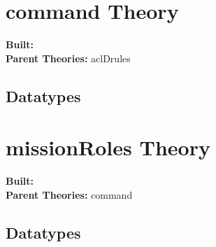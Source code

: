 

% 

% 
% 
% 
% 
% 
% 


\section{command Theory}
\begin{flushleft}
\textbf{Built:} \HOLcommandDate \\[2pt]
\textbf{Parent Theories:} aclDrules
\end{flushleft}

\subsection{Datatypes}

\HOLcommandDatatypes



\section{missionRoles Theory}
\begin{flushleft}
\textbf{Built:} \HOLmissionRolesDate \\[2pt]
\textbf{Parent Theories:} command
\end{flushleft}

\subsection{Datatypes}

